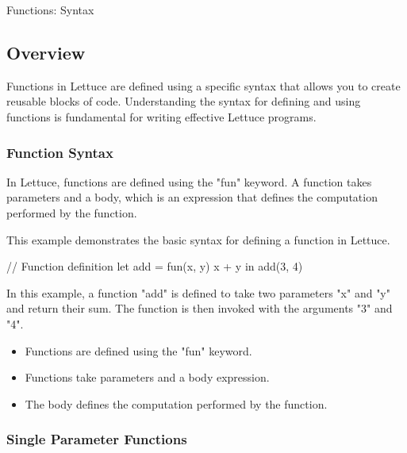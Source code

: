 \begin{notes}{Functions: Syntax}
    \subsection*{Overview}

    Functions in Lettuce are defined using a specific syntax that allows you to create reusable blocks of code. Understanding the syntax for defining and using functions is fundamental for writing 
    effective Lettuce programs.
    
    \subsubsection*{Function Syntax}
    
    In Lettuce, functions are defined using the "fun" keyword. A function takes parameters and a body, which is an expression that defines the computation performed by the function.
    
    \begin{highlight}
    
        This example demonstrates the basic syntax for defining a function in Lettuce.
    
    \begin{code}[Lettuce]
    // Function definition
    let add = fun(x, y) {
        x + y
    } in
    add(3, 4)
    \end{code}
    
        In this example, a function "add" is defined to take two parameters "x" and "y" and return their sum. The function is then invoked with the arguments "3" and "4".
    
        \begin{itemize}
            \item Functions are defined using the "fun" keyword.
            \item Functions take parameters and a body expression.
            \item The body defines the computation performed by the function.
        \end{itemize}
    
    \end{highlight}
    
    \subsubsection*{Single Parameter Functions}
    

\end{notes}
